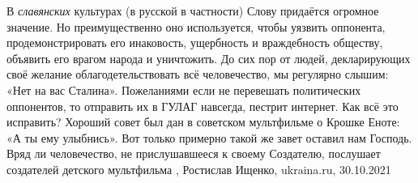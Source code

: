 В \emph{славянских} культурах (в русской в частности) Слову придаётся огромное
значение. Но преимущественно оно используется, чтобы уязвить оппонента,
продемонстрировать его инаковость, ущербность и враждебность обществу, объявить
его врагом народа и уничтожить. До сих пор от людей, декларирующих своё желание
облагодетельствовать всё человечество, мы регулярно слышим: «Нет на вас
Сталина». Пожеланиями если не перевешать политических оппонентов, то отправить
их в ГУЛАГ навсегда, пестрит интернет.  Как всё это исправить? Хороший совет
был дан в советском мультфильме о Крошке Еноте: «А ты ему улыбнись». Вот только
примерно такой же завет оставил нам Господь. Вряд ли человечество, не
прислушавшееся к своему Создателю, послушает создателей детского мультфильма
, 
Ростислав Ищенко, ukraina.ru, 30.10.2021

